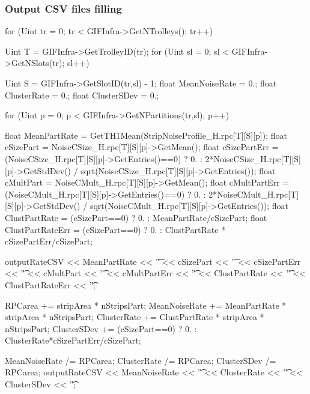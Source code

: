 		\subsubsection{Output CSV files filling}
		\label{app2:sssec:CSVoutput}
		
	\begin{code}
	\begin{cppcode}
for (Uint tr = 0; tr < GIFInfra->GetNTrolleys(); tr++){
	Uint T = GIFInfra->GetTrolleyID(tr);
	for (Uint sl = 0; sl < GIFInfra->GetNSlots(tr); sl++){
		Uint S = GIFInfra->GetSlotID(tr,sl) - 1;
		float MeanNoiseRate = 0.;
		float ClusterRate   = 0.;
		float ClusterSDev   = 0.;

		for (Uint p = 0; p < GIFInfra->GetNPartitions(tr,sl); p++){
			float MeanPartRate = GetTH1Mean(StripNoiseProfile_H.rpc[T][S][p]);
			float cSizePart = NoiseCSize_H.rpc[T][S][p]->GetMean();
			float cSizePartErr = (NoiseCSize_H.rpc[T][S][p]->GetEntries()==0)
				? 0.
				: 2*NoiseCSize_H.rpc[T][S][p]->GetStdDev() /
							sqrt(NoiseCSize_H.rpc[T][S][p]->GetEntries());
			float cMultPart = NoiseCMult_H.rpc[T][S][p]->GetMean();
			float cMultPartErr = (NoiseCMult_H.rpc[T][S][p]->GetEntries()==0)
				? 0.
				: 2*NoiseCMult_H.rpc[T][S][p]->GetStdDev() /
							sqrt(NoiseCMult_H.rpc[T][S][p]->GetEntries());
			float ClustPartRate = (cSizePart==0) ? 0.
				: MeanPartRate/cSizePart;
			float ClustPartRateErr = (cSizePart==0) ? 0.
				: ClustPartRate * cSizePartErr/cSizePart;

			outputRateCSV << MeanPartRate << '\t'
				<< cSizePart << '\t' << cSizePartErr << '\t'
				<< cMultPart << '\t' << cMultPartErr << '\t'
				<< ClustPartRate << '\t' << ClustPartRateErr << '\t';
				
			RPCarea       += stripArea * nStripsPart;
			MeanNoiseRate += MeanPartRate * stripArea * nStripsPart;
			ClusterRate   += ClustPartRate * stripArea * nStripsPart;
			ClusterSDev   += (cSizePart==0)
				? 0.
				: ClusterRate*cSizePartErr/cSizePart;
		}
		MeanNoiseRate /= RPCarea;
		ClusterRate   /= RPCarea;
		ClusterSDev   /= RPCarea;
		outputRateCSV << MeanNoiseRate << '\t' << ClusterRate << '\t'
		              << ClusterSDev << '\t';
	}
}
	\end{cppcode}
	\label{cpp:ratecsv}
	\vspace{5mm}
	\end{code}
		
